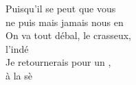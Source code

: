 \songwordfb{} Puisqu'il se peut que vous \\
ne puis mais jamais nous en \\
On va tout débal, le crasseux, \\
l'indé \\
Je retournerais pour un , \\
à la sè 
